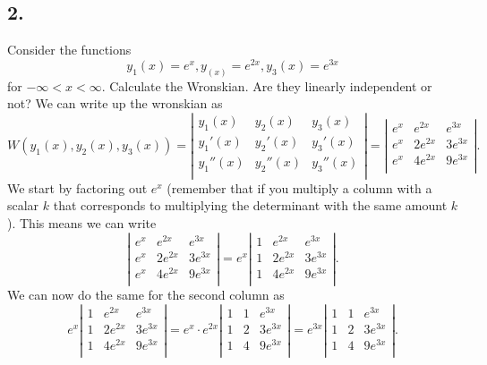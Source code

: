 \subsection*{2.} Consider the functions
\[ 
y_1(x) = e^{x}, y_(x) = e^{2x}, y_3(x) = e^{3x}
\]
for $-\infty < x < \infty$. Calculate the Wronskian. Are they linearly independent or not?
\bigbreak
We can write up the wronskian as
\[ 
W(y_1(x), y_2(x), y_3(x)) = \left| \begin{array}{ccc}
y_1(x) & y_2(x) & y_3(x)\\
y_1'(x) & y_2'(x) & y_3'(x)\\
y_1''(x) & y_2''(x) & y_3''(x)\\
\end{array} \right| = \left| \begin{array}{ccc}
e^{x} & e^{2x} & e^{3x}\\
e^{x} & 2e^{2x} & 3e^{3x}\\
e^{x} & 4e^{2x} & 9e^{3x}\\
\end{array} \right|
.\]
We start by factoring out $e^{x}$ (remember that if you multiply a column with a scalar $k$ that corresponds to multiplying the determinant with the same amount $k$). This means we can write
\[ 
\left| \begin{array}{ccc}
e^{x} & e^{2x} & e^{3x}\\
e^{x} & 2e^{2x} & 3e^{3x}\\
e^{x} & 4e^{2x} & 9e^{3x}\\
\end{array} \right| = e^{x} \left| \begin{array}{ccc}
1 & e^{2x} & e^{3x}\\
1 & 2e^{2x} & 3e^{3x}\\
1 & 4e^{2x} & 9e^{3x}\\
\end{array} \right|
.\]
We can now do the same for the second column as
\[ 
e^{x} \left| \begin{array}{ccc}
1 & e^{2x} & e^{3x}\\
1 & 2e^{2x} & 3e^{3x}\\
1 & 4e^{2x} & 9e^{3x}\\
\end{array} \right| = e^{x} \cdot e^{2x} \left| \begin{array}{ccc}
1 & 1 & e^{3x}\\
1 & 2 & 3e^{3x}\\
1 & 4 & 9e^{3x}\\
\end{array} \right| = e^{3x} \left| \begin{array}{ccc}
1 & 1 & e^{3x}\\
1 & 2 & 3e^{3x}\\
1 & 4 & 9e^{3x}\\
\end{array} \right|
.\]
